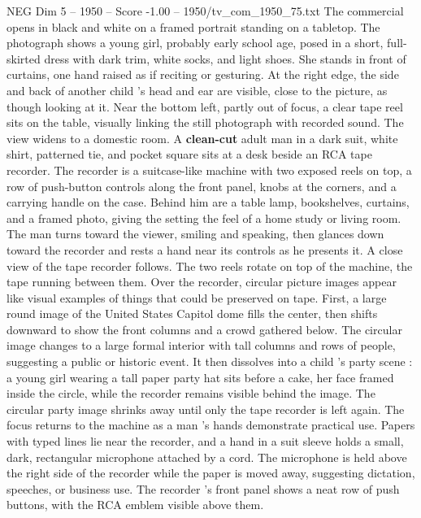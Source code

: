 \begin{textsample}{NEG Dim 5 – 1950 – Score -1.00 – 1950/tv\_com\_1950\_75.txt}  \label{ex:f5_neg_027}
The commercial opens in black and white on a framed portrait standing on a tabletop.
The photograph shows a young girl, probably early school age, posed in a short, full-skirted dress with dark trim, white socks, and light shoes.
She stands in front of curtains, one hand raised as if reciting or gesturing.
At the right edge, the side and back of another child ’s head and ear are visible, close to the picture, as though looking at it.
Near the bottom left, partly out of focus, a clear tape reel sits on the table, visually linking the still photograph with recorded sound.
The view widens to a domestic room.
A \textbf{clean-cut} adult man in a dark suit, white shirt, patterned tie, and pocket square sits at a desk beside an RCA tape recorder.
The recorder is a suitcase-like machine with two exposed reels on top, a row of push-button controls along the front panel, knobs at the corners, and a carrying handle on the case.
Behind him are a table lamp, bookshelves, curtains, and a framed photo, giving the setting the feel of a home study or living room.
The man turns toward the viewer, smiling and speaking, then glances down toward the recorder and rests a hand near its controls as he presents it.
A close view of the tape recorder follows.
The two reels rotate on top of the machine, the tape running between them.
Over the recorder, circular picture images appear like visual examples of things that could be preserved on tape.
First, a large round image of the United States Capitol dome fills the center, then shifts downward to show the front columns and a crowd gathered below.
The circular image changes to a large formal interior with tall columns and rows of people, suggesting a public or historic event.
It then dissolves into a child ’s party scene : a young girl wearing a tall paper party hat sits before a cake, her face framed inside the circle, while the recorder remains visible behind the image.
The circular party image shrinks away until only the tape recorder is left again.
The focus returns to the machine as a man ’s hands demonstrate practical use.
Papers with typed lines lie near the recorder, and a hand in a suit sleeve holds a small, dark, rectangular microphone attached by a cord.
The microphone is held above the right side of the recorder while the paper is moved away, suggesting dictation, speeches, or business use.
The recorder ’s front panel shows a neat row of push buttons, with the RCA emblem visible above them.

\end{textsample}
